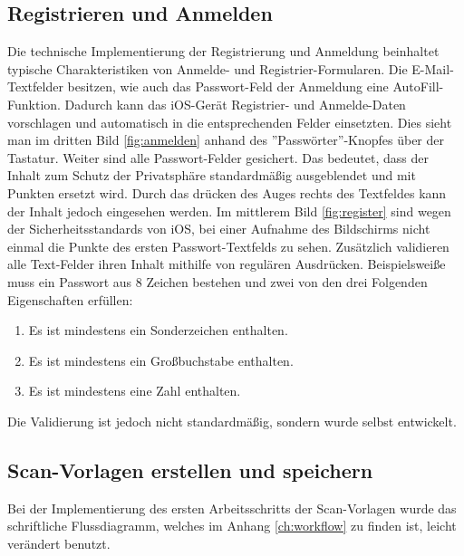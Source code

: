 \documentclass[nomenclature, oneside, 150]{HSMW-Thesis}
\begin{document}
		\subsection{Registrieren und Anmelden}
			Die technische Implementierung der Registrierung und Anmeldung beinhaltet typische Charakteristiken von Anmelde- und Registrier-Formularen. Die E-Mail-Textfelder besitzen, wie auch das Passwort-Feld der Anmeldung eine AutoFill-Funktion. Dadurch kann das iOS-Gerät Registrier- und Anmelde-Daten vorschlagen und automatisch in die entsprechenden Felder einsetzten. Dies sieht man im dritten Bild \ref{fig:anmelden} anhand des ''Passwörter''-Knopfes über der Tastatur.  Weiter sind alle Passwort-Felder gesichert. Das bedeutet, dass der Inhalt zum Schutz der Privatsphäre standardmäßig ausgeblendet und mit Punkten ersetzt wird. Durch das drücken des Auges rechts des Textfeldes kann der Inhalt jedoch eingesehen werden. Im mittlerem Bild \ref{fig:register} sind wegen der Sicherheitsstandards von iOS, bei einer Aufnahme des Bildschirms nicht einmal die Punkte des ersten Passwort-Textfelds zu sehen. Zusätzlich validieren alle Text-Felder ihren Inhalt mithilfe von regulären Ausdrücken. Beispielsweiße muss ein Passwort aus 8 Zeichen bestehen und zwei von den drei Folgenden Eigenschaften erfüllen:
			\begin{enumerate}
				\item Es ist mindestens ein Sonderzeichen enthalten.
				\item Es ist mindestens ein Großbuchstabe enthalten.
				\item Es ist mindestens eine Zahl enthalten.
			\end{enumerate}
			Die Validierung ist jedoch nicht standardmäßig, sondern wurde selbst entwickelt.
			
		\subsection{Scan-Vorlagen erstellen und speichern}
			Bei der Implementierung des ersten Arbeitsschritts der Scan-Vorlagen wurde das schriftliche Flussdiagramm, welches im Anhang \ref{ch:workflow} zu finden ist, leicht verändert benutzt.
			
\end{document}
